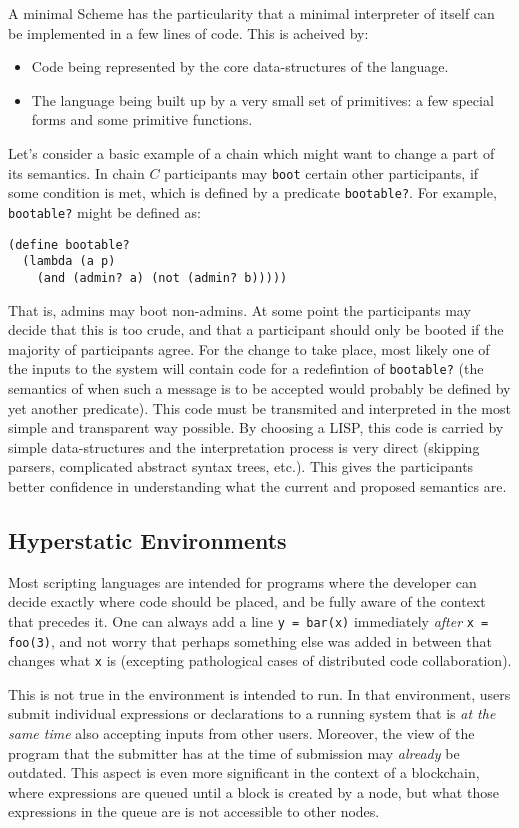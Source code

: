 A minimal Scheme has the particularity that a minimal interpreter of itself can
be implemented in a few lines of code. This is acheived by:
\begin{itemize}
  \item Code being represented by the core data-structures of the language.
  \item The language being built up by a very small set of primitives: a few
    special forms and some primitive functions.
\end{itemize}
Let's consider a basic example of a chain which might want to change a part of
its semantics. In chain $C$ participants may \texttt{boot} certain other
participants, if some condition is met, which is defined by a predicate
\texttt{bootable?}. For example, \texttt{bootable?} might be defined as:
\begin{verbatim}
(define bootable?
  (lambda (a p)
    (and (admin? a) (not (admin? b)))))
\end{verbatim}
That is, admins may boot non-admins. At some point the participants may decide
that this is too crude, and that a participant should only be booted if the
majority of participants agree. For the change to take place, most likely one of
the inputs to the system will contain code for a redefintion of
\texttt{bootable?} (the semantics of when such a message is to be accepted would
probably be defined by yet another predicate). This code must be transmited and
interpreted in the most simple and transparent way possible. By choosing a LISP,
this code is carried by simple data-structures and the interpretation process is
very direct (skipping parsers, complicated abstract syntax trees, etc.). This
gives the participants better confidence in understanding what the current and
proposed semantics are.

\subsection{Hyperstatic Environments}
\label{s:hyperstatic}

Most scripting languages are intended for programs where the developer can
decide exactly where code should be placed, and be fully aware of the context
that precedes it. One can always add a line \texttt{y = bar(x)} immediately
\textit{after} \texttt{x = foo(3)}, and not worry that perhaps something else
was added in between that changes what \texttt{x} is (excepting pathological
cases of distributed code collaboration).

This is not true in the environment \rad is intended to run. In that
environment, users submit individual expressions or declarations to a running
system that is \emph{at the same time} also accepting inputs from other
users. Moreover, the view of the program that the submitter has at the time of
submission may \emph{already} be outdated. This aspect is even more significant
in the context of a blockchain, where expressions are queued until a block is
created by a node, but what those expressions in the queue are is not
accessible to other nodes.

